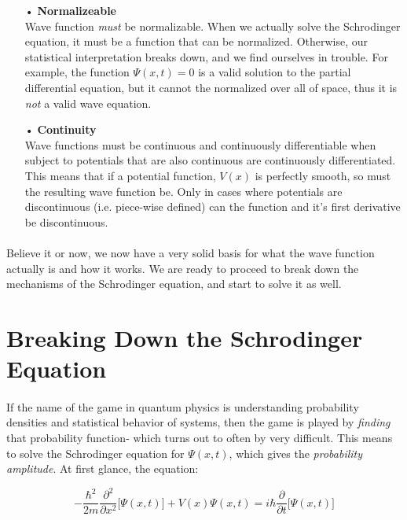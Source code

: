 \documentclass[12pt,letterpaper]{book}
\begin{document}
\begin{enumerate}
\item[•]\textbf{Normalizeable}\\
Wave function \textit{must} be normalizable. When we actually solve the Schrodinger equation, it must be a function that can be normalized. Otherwise, our statistical interpretation breaks down, and we find ourselves in trouble. For example, the function $\Psi(x,t) = 0$ is a valid solution to the partial differential equation, but it cannot the normalized over all of space, thus it is \textit{not} a valid wave equation.
\item[•]\textbf{Continuity}\\
Wave functions must be continuous and continuously differentiable when subject to potentials that are also continuous are continuously differentiated. This means that if a potential function, $V(x)$ is perfectly smooth, so must the resulting wave function be. Only in cases where potentials are discontinuous (i.e. piece-wise defined) can the function and it's first derivative be discontinuous.
\end{enumerate}

\paragraph*{}Believe it or now, we now have a very solid basis for what the wave function actually is and how it works. We are ready to proceed to break down the mechanisms of the Schrodinger equation, and start to solve it as well.


\section{Breaking Down the Schrodinger Equation}

\paragraph*{}If the name of the game in quantum physics is understanding probability densities and statistical behavior of systems, then the game is played by \textit{finding} that probability function- which turns out to often by very difficult. This means to solve the Schrodinger equation for $\Psi(x,t)$, which gives the \textit{probability amplitude}. At first glance, the equation:

\begin{equation}
\label{1D Schrodinger expanded}
-\frac{\hbar^2}{2m}\frac{\partial^2}{\partial x^2}\Big[ \Psi(x,t) \Big] +
V(x)\Psi(x,t) = i\hbar\frac{\partial}{\partial t}\Big[ \Psi(x,t) \Big]
\end{equation}
\end{document}
